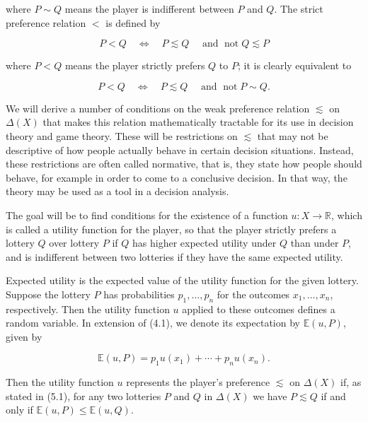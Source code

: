 \documentclass[12pt]{article}
\begin{document}
where $P \sim Q$ means the player is indifferent between $P$ and $Q$. The strict preference relation $<$ is defined by


\begin{equation*}
P<Q \quad \Leftrightarrow \quad P \lesssim Q \quad \text { and } \operatorname{not} Q \lesssim P \tag{5.5}
\end{equation*}


where $P<Q$ means the player strictly prefers $Q$ to $P$; it is clearly equivalent to

$$
P<Q \quad \Leftrightarrow \quad P \lesssim Q \quad \text { and } \operatorname{not} P \sim Q .
$$

We will derive a number of conditions on the weak preference relation $\lesssim$ on $\Delta(X)$ that makes this relation mathematically tractable for its use in decision theory and game theory. These will be restrictions on $\lesssim$ that may not be descriptive of how people actually behave in certain decision situations. Instead, these restrictions are often called normative, that is, they state how people should behave, for example in order to come to a conclusive decision. In that way, the theory may be used as a tool in a decision analysis.

The goal will be to find conditions for the existence of a function $u: X \rightarrow \mathbb{R}$, which is called a utility function for the player, so that the player strictly prefers a lottery $Q$ over lottery $P$ if $Q$ has higher expected utility under $Q$ than under $P$, and is indifferent between two lotteries if they have the same expected utility.

Expected utility is the expected value of the utility function for the given lottery. Suppose the lottery $P$ has probabilities $p_{1}, \ldots, p_{n}$ for the outcomes $x_{1}, \ldots, x_{n}$, respectively. Then the utility function $u$ applied to these outcomes defines a random variable. In extension of (4.1), we denote its expectation by $\mathbb{E}(u, P)$, given by


\begin{equation*}
\mathbb{E}(u, P)=p_{1} u\left(x_{1}\right)+\cdots+p_{n} u\left(x_{n}\right) . \tag{5.6}
\end{equation*}


Then the utility function $u$ represents the player's preference $\lesssim$ on $\Delta(X)$ if, as stated in (5.1), for any two lotteries $P$ and $Q$ in $\Delta(X)$ we have $P \lesssim Q$ if and only if $\mathbb{E}(u, P) \leq \mathbb{E}(u, Q)$.
\end{document}
